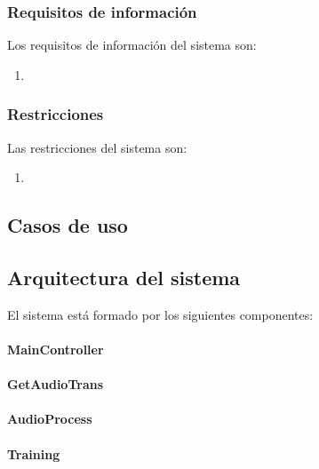 \documentclass[../main.tex]{subfiles}
\begin{document}
\subsubsection{Requisitos de información}\label{subsubsec:req_informacion}
Los requisitos de información del sistema son:
\begin{enumerate}
    \item 
\end{enumerate}

\subsubsection{Restricciones}\label{subsubsec:restricciones}
Las restricciones del sistema son:
\begin{enumerate}
    \item 
\end{enumerate}

\subsection{Casos de uso}\label{subsec:casos_uso}

\subsection{Arquitectura del sistema}\label{subsec:arquitectura_sistema}
El sistema está formado por los siguientes componentes:
\paragraph{MainController}
\paragraph{GetAudioTrans}
\paragraph{AudioProcess}
\paragraph{Training}
\end{document}
